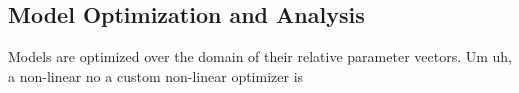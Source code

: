 \subsection{Model Optimization and Analysis}

Models are optimized over the domain of their relative parameter vectors. Um uh, a non-linear no a custom non-linear optimizer is 

\subsubsection{}